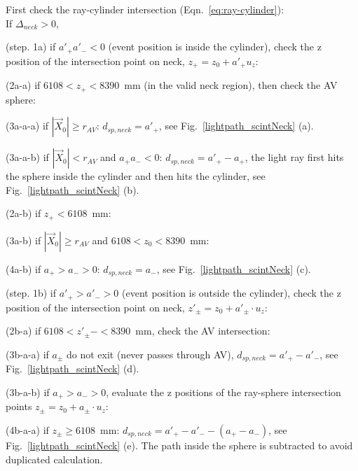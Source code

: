 \begin{algorithm}
	
	First check the ray-cylinder intersection (Eqn.~\ref{eq:ray-cylinder}):\\
	If {$\Delta_{neck}>0$}, 
	
	\hspace{2mm}(step. 1a) if $a'_+a'_-<0$ (event position is inside the cylinder), check the z position of the intersection point on neck, $z_+ = z_0 + a'_+u_z$: 
	
	\hspace{6mm}(2a-a) if $6108<z_+<8390$~mm (in the valid neck region), then check the AV sphere:
	
	\hspace{8mm}(3a-a-a) if $|\vec{X}_0|\geq r_{AV}$: $d_{sp,neck}=a'_+$, see Fig.~\ref{lightpath_scintNeck} (a).
	
	\hspace{8mm}(3a-a-b) if $|\vec{X}_0|<r_{AV}$ and $a_+a_-<0$: $d_{sp,neck}=a'_+-a_+$, the light ray first hits the sphere inside the cylinder and then hits the cylinder, see Fig.~\ref{lightpath_scintNeck} (b). 
	
	\hspace{6mm}(2a-b) if $z_+<6108$~mm:
	
	\hspace{8mm}(3a-b) if $|\vec X_0|\geq r_{AV}$ and $6108<z_0<8390$~mm:
	
	\hspace{10mm}(4a-b) if $a_+>a_->0$: $d_{sp,neck}=a_-$, see Fig.~\ref{lightpath_scintNeck} (c).
	
	\hspace{2mm}(step. 1b) if $a'_+>a'_->0$ (event position is outside the cylinder), check the z position of the intersection point on neck, $z'_{\pm}=z_0+a'_\pm\cdot u_z$:
	
	\hspace{6mm}(2b-a) if $6108<z'_\pm-<8390$~mm, check the AV intersection:
	
	\hspace{8mm}(3b-a-a) if $a_\pm$ do not exit (never passes through AV), $d_{sp,neck}=a'_+ - a'_-$, see Fig.~\ref{lightpath_scintNeck} (d).
	
	\hspace{8mm}(3b-a-b) if $a_+>a_->0$, evaluate the z positions of the ray-sphere intersection points $z_\pm=z_0+a_\pm\cdot u_z$:
	
	\hspace{10mm}(4b-a-a) if $z_\pm\geq 6108$~mm: $d_{sp,neck}=a'_+ - a'_--(a_+-a_-)$, see Fig.~\ref{lightpath_scintNeck} (e). The path inside the sphere is subtracted to avoid duplicated calculation.
	

\end{algorithm}
